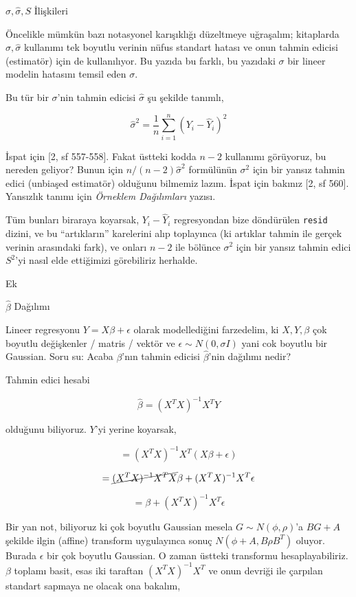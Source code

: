 \documentclass[12pt,fleqn]{article}\usepackage{../../common}
\begin{document}
$\sigma,\hat{\sigma},S$ İlişkileri

Öncelikle mümkün bazı notasyonel karışıklığı düzeltmeye uğraşalım;
kitaplarda $\sigma,\hat{\sigma}$ kullanımı tek boyutlu verinin nüfus
standart hatası ve onun tahmin edicisi (estimatör) için de kullanılıyor. Bu
yazıda bu farklı, bu yazıdaki $\sigma$ bir lineer modelin hatasını temsil
eden $\sigma$. 

Bu tür bir $\sigma$'nin tahmin edicisi $\hat{\sigma}$ şu şekilde tanımlı, 

$$ \hat{\sigma}^2 = \frac{1}{n} \sum_{i=1}^{n} (Y_i - \hat{Y}_i)^2 $$

İspat için [2, sf 557-558]. Fakat üstteki kodda $n-2$ kullanımı görüyoruz,
bu nereden geliyor? Bunun için $n/(n-2) \hat{\sigma}^2$ formülünün
$\sigma^2$ için bir yansız tahmin edici (unbiaşed estimatör) olduğunu
bilmemiz lazım. İspat için bakınız [2, sf 560]. Yansızlık tanımı için {\em
  Örneklem Dağılımları} yazısı.

Tüm bunları biraraya koyarsak, $Y_i - \hat{Y}_i$ regresyondan bize
döndürülen \verb!resid! dizini, ve bu ``artıkların'' karelerini alıp
toplayınca (ki artıklar tahmin ile gerçek verinin arasındaki fark), ve
onları $n-2$ ile bölünce $\sigma^2$ için bir yansız tahmin edici $S^2$'yi
nasıl elde ettiğimizi görebiliriz herhalde.

Ek

$\hat{\beta}$ Dağılımı

Lineer regresyonu $Y=X\beta + \epsilon$ olarak modellediğini farzedelim, ki
$X,Y,\beta$ çok boyutlu değişkenler / matris / vektör ve $\epsilon \sim
N(0,\sigma I)$ yani cok boyutlu bir Gaussian.  Soru su: Acaba $\beta$'nın
tahmin edicisi $\hat{\beta}$'nin dağılımı nedir?

Tahmin edici hesabi

$$ \hat{\beta} = (X^TX)^{-1}X^TY $$

olduğunu biliyoruz. $Y$'yi yerine koyarsak,

$$  = (X^TX)^{-1}X^T(X\beta + \epsilon) $$

$$  = \cancel{(X^TX)^{-1}X^TX}\beta + (X^TX)^{-1}X^T\epsilon $$

$$  = \beta + (X^TX)^{-1}X^T\epsilon $$

Bir yan not, biliyoruz ki çok boyutlu Gaussian mesela $G \sim N(\phi,\rho)$'a
$BG + A$ şekilde ilgin (affine) transform uygulayınca sonuç 
$N(\phi+A, B\rho B^T)$ oluyor. Burada $\epsilon$ bir çok boyutlu
Gaussian. O zaman üstteki transformu hesaplayabiliriz. $\beta$ toplamı
basit, esas iki taraftan $(X^TX)^{-1}X^T$ ve onun devriği
ile çarpılan standart sapmaya ne olacak ona bakalım,
\end{document}
